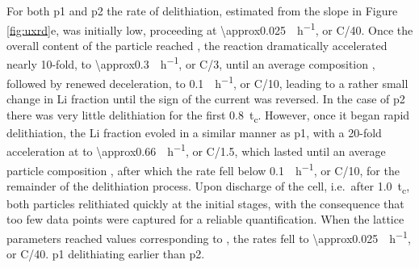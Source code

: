 \documentclass{article}
\begin{document}
For both \gls{p1} and \gls{p2} the rate of delithiation, estimated
from the slope in Figure \ref{fig:uxrd}e, was initially low,
proceeding at \SI{\approx0.025}{\per\hour}, or C/40. Once the
overall content of the particle reached , the reaction
dramatically accelerated nearly 10-fold, to
\SI{\approx0.3}{\per\hour}, or C/3, until an average
composition , followed by renewed deceleration, to
\SI{0.1}{\per\hour}, or C/10, leading to a rather small change
in Li fraction until the sign of the current was reversed. In the case
of \gls{p2} there was very little delithiation for the first
\SI{0.8}{t_c}. However, once it began rapid delithiation, the Li
fraction evoled in a similar manner as \gls{p1}, with a 20-fold
acceleration at  to \SI{\approx0.66}{\per\hour}, or
C/1.5, which lasted until an average particle composition ,
after which the rate fell below \SI{0.1}{\per\hour}, or C/10,
for the remainder of the delithiation process. Upon discharge of the
cell, i.e.\ after \SI{1.0}{t_c}, both particles relithiated quickly at
the initial stages, with the consequence that too few data points were
captured for a reliable quantification. When the lattice parameters
reached values corresponding to , the rates fell to
\SI{\approx0.025}{\per\hour}, or C/40.  \gls{p1} delithiating earlier than \gls{p2}.



\end{document}
